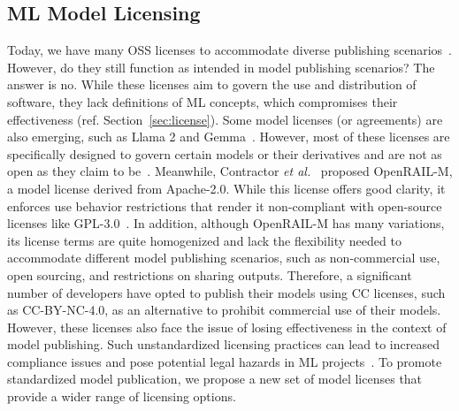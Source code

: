 \subsection{ML Model Licensing}
Today, we have many OSS licenses to accommodate diverse publishing scenarios~\cite{rosen2005open}. However, do they still function as intended in model publishing scenarios? The answer is no. While these licenses aim to govern the use and distribution of software, they lack definitions of ML concepts, which compromises their effectiveness (ref. Section~\ref{sec:license}).
Some model licenses (or agreements) are also emerging, such as Llama 2 and Gemma~\cite{gemma2024}. 
However, most of these licenses are specifically designed to govern certain models or their derivatives and are not as open as they claim to be~\cite{liesenfeld2024rethinking}. 
Meanwhile, Contractor \textit{et al.}~\cite{contractor2022behavioral} proposed OpenRAIL-M, a model license derived from Apache-2.0. 
While this license offers good clarity, it enforces use behavior restrictions that render it non-compliant with open-source licenses like GPL-3.0~\cite{greenbaum2016the}.
In addition, although OpenRAIL-M has many variations, its license terms are quite homogenized and lack the flexibility needed to accommodate different model publishing scenarios, such as non-commercial use, open sourcing, and restrictions on sharing outputs. 
Therefore, a significant number of developers have opted to publish their models using CC licenses, such as CC-BY-NC-4.0, as an alternative to prohibit commercial use of their models.
However, these licenses also face the issue of losing effectiveness in the context of model publishing.
Such unstandardized licensing practices can lead to increased compliance issues and pose potential legal hazards in ML projects~\cite{duan2024modelgo}. 
To promote standardized model publication, we propose a new set of model licenses that provide a wider range of licensing options.